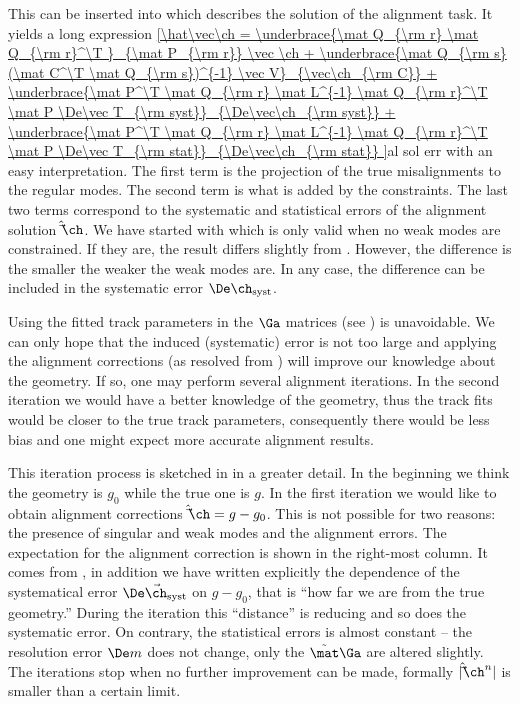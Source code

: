 This can be inserted into  which describes the solution of the alignment task. It yields a long expression
\eqref{\hat\vec\ch =
	\underbrace{\mat Q_{\rm r} \mat Q_{\rm r}^\T }_{\mat P_{\rm r}} \vec \ch
	+ \underbrace{\mat Q_{\rm s} (\mat C^\T \mat Q_{\rm s})^{-1} \vec V}_{\vec\ch_{\rm C}}
	+ \underbrace{\mat P^\T \mat Q_{\rm r} \mat L^{-1} \mat Q_{\rm r}^\T \mat P \De\vec T_{\rm syst}}_{\De\vec\ch_{\rm syst}}
	+ \underbrace{\mat P^\T \mat Q_{\rm r} \mat L^{-1} \mat Q_{\rm r}^\T \mat P \De\vec T_{\rm stat}}_{\De\vec\ch_{\rm stat}}
}{al sol err}
with an easy interpretation. The first term is the projection of the true misalignments to the regular modes. The second term is what is added by the constraints. The last two terms correspond to the systematic and statistical errors of the alignment solution $\hat\vec\ch$. We have started with  which is only valid when no weak modes are constrained. If they are, the result differs slightly from . However, the difference is the smaller the weaker the weak modes are. In any case, the difference can be included in the systematic error $\De\ch_{\rm syst}$.

Using the fitted track parameters in the $\Ga$ matrices (see ) is unavoidable. We can only hope that the induced (systematic) error is not too large and applying the alignment corrections (as resolved from ) will improve our knowledge about the geometry. If so, one may perform several alignment iterations. In the second iteration we would have a better knowledge of the geometry, thus the track fits would be closer to the true track parameters, consequently there would be less bias and one might expect more accurate alignment results.

This iteration process is sketched in  in a greater detail. In the beginning we think the geometry is $g_0$ while the true one is $g$. In the first iteration we would like to obtain alignment corrections $\hat\vec\ch = g - g_0$. This is not possible for two reasons: the presence of singular and weak modes and the alignment errors. The expectation for the alignment correction is shown in the right-most column. It comes from , in addition we have written explicitly the dependence of the systematical error $\De\vec\ch_{\rm syst}$ on $g - g_0$, that is ``how far we are from the true geometry.'' During the iteration this ``distance'' is reducing and so does the systematic error. On contrary, the statistical errors is almost constant -- the resolution error $\De m$ does not change, only the $\tilde\mat\Ga$ are altered slightly. The iterations stop when no further improvement can be made, formally $|\hat\vec\ch^n|$ is smaller than a certain limit.

